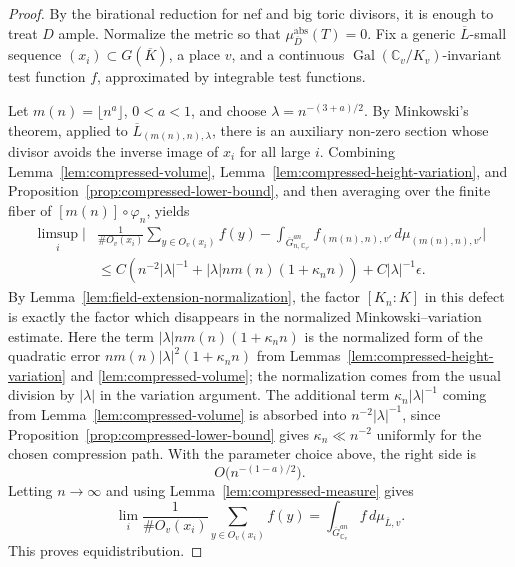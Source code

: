 \documentclass[10pt,a4paper]{amsart}
\theoremstyle{plain}
\DeclareMathOperator{\Gal}{Gal}
\theoremstyle{plain}
\numberwithin{equation}{section}
\providecommand{\ol}{\overline}
\begin{document}
\begin{proof}
	By the birational reduction for nef and big toric divisors, it is enough to
	treat \(D\) ample.  Normalize the metric so that
	\(\mu_{\ol D}^{\mathrm{abs}}(T)=0\).  Fix a generic \(\ol L\)-small sequence
	\((x_i)\subset G(\ol K)\), a place \(v\), and a continuous
	\(\Gal(\mathbb{C}_v/K_v)\)-invariant test function \(f\), approximated by
	integrable test functions.
	
	Let \(m(n)=\lfloor n^a\rfloor\), \(0<a<1\), and choose
	\(\lambda=n^{-(3+a)/2}\).  By Minkowski's theorem, applied to
	\(\ol L_{(m(n),n),\lambda}\), there is an auxiliary non-zero section whose
	divisor avoids the inverse image of \(x_i\) for all large \(i\).  Combining
	Lemma~\ref{lem:compressed-volume}, Lemma~\ref{lem:compressed-height-variation},
	and Proposition~\ref{prop:compressed-lower-bound}, and then averaging over the
	finite fiber of \([m(n)]\circ\varphi_n\), yields
	\[
	\begin{aligned}
		\limsup_i
		\biggl|
		&\frac{1}{\#O_v(x_i)}\sum_{y\in O_v(x_i)} f(y)
		-
		\int_{\ol G_{n,\mathbb{C}_{v'}}^{an}}
		f_{(m(n),n),v'}\,d\mu_{(m(n),n),v'}
		\biggr| \\
		&\le
		C\left(
		n^{-2}|\lambda|^{-1}
		+|\lambda|nm(n)(1+\kappa_n n)
		\right)
		+C|\lambda|^{-1}\epsilon.
	\end{aligned}
	\]
	By Lemma~\ref{lem:field-extension-normalization}, the factor \([K_n:K]\) in
	this defect is exactly the factor which disappears in the normalized
	Minkowski--variation estimate.
	Here the term \(|\lambda|nm(n)(1+\kappa_n n)\) is the normalized form of the
	quadratic error \(nm(n)|\lambda|^2(1+\kappa_n n)\) from
	Lemmas~\ref{lem:compressed-height-variation} and
	\ref{lem:compressed-volume}; the normalization comes from the usual division by
	\(|\lambda|\) in the variation argument.
	The additional term \(\kappa_n|\lambda|^{-1}\) coming from
	Lemma~\ref{lem:compressed-volume} is absorbed into
	\(n^{-2}|\lambda|^{-1}\), since
	Proposition~\ref{prop:compressed-lower-bound} gives
	\(\kappa_n\ll n^{-2}\) uniformly for the chosen compression path.
	With the parameter choice above, the right side is
	\[
	O\bigl(n^{-(1-a)/2}\bigr).
	\]
	Letting \(n\to\infty\) and using Lemma~\ref{lem:compressed-measure} gives
	\[
	\lim_i
	\frac{1}{\#O_v(x_i)}
	\sum_{y\in O_v(x_i)} f(y)
	=
	\int_{\ol G_{\mathbb{C}_v}^{an}}f\,d\mu_{\ol L,v}.
	\]
	This proves equidistribution.
\end{proof}
\end{document}
